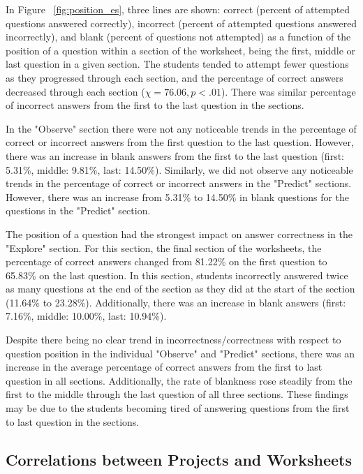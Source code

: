 In Figure ~\ref{fig:position_es}, three lines are shown: correct (percent of attempted questions answered correctly), incorrect (percent of attempted questions answered incorrectly), and blank (percent of questions not attempted) as a function of the position of a question within a section of the worksheet, being the first, middle or last question in a given section. The students tended to attempt fewer questions as they progressed through each section, and the percentage of correct answers decreased through each section ($\chi=76.06, p<.01$). There was similar percentage of incorrect answers from the first to the last question in the sections.

In the "Observe" section there were not any noticeable trends in the percentage of correct or incorrect answers from the first question to the last question. However, there was an increase in blank answers from the first to the last question (first: 5.31\%, middle: 9.81\%, last: 14.50\%). Similarly, we did not observe any noticeable trends in the percentage of correct or incorrect answers in the "Predict" sections. However, there was an increase from 5.31\% to 14.50\% in blank questions for the questions in the "Predict" section.

The position of a question had the strongest impact on answer correctness in the "Explore" section.  For this section, the final section of the worksheets, the percentage of correct answers changed from 81.22\% on the first question to 65.83\% on the last question. In this section, students incorrectly answered twice as many questions at the end of the section as they did at the start of the section (11.64\% to 23.28\%). Additionally, there was an increase in blank answers (first: 7.16\%, middle: 10.00\%, last: 10.94\%).

Despite there being no clear trend in incorrectness/correctness with respect to question position in the individual "Observe" and "Predict" sections, there was an increase in the average percentage of correct answers from the first to last question in all sections. Additionally, the rate of blankness rose steadily from the first to the middle through the last question of all three sections. These findings may be due to the students becoming tired of answering questions from the first to last question in the sections.

\subsection{Correlations between Projects and Worksheets}


